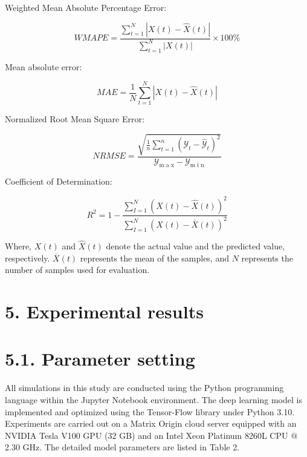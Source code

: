 \documentclass[
  10
]{article}
\begin{document}
Weighted Mean Absolute Percentage Error:

\[
W M A P E = \frac {\sum_ {t = 1} ^ {N} | X (t) - \widehat {X} (t) |}{\sum_ {t = 1} ^ {N} | X (t) |} \times 100 \% \tag{37}
\]

Mean absolute error:

\[
M A E = \frac {1}{N} \sum_ {t = 1} ^ {N} | X (t) - \widehat {X} (t) | \tag {38}
\]

Normalized Root Mean Square Error:

\[
N R M S E = \frac {\sqrt {\frac {1}{n} \sum_ {t = 1} ^ {n} \left(\mathcal {Y} _ {t} - \widehat {\mathcal {Y}} _ {t}\right) ^ {2}}}{\mathcal {Y} _ {\text {m a x}} - \mathcal {Y} _ {\text {m i n}}} \tag {39}
\]

Coefficient of Determination:

\[
R ^ {2} = 1 - \frac {\sum_ {I = 1} ^ {N} (X (t) - \widehat {X} (t)) ^ {2}}{\sum_ {I = 1} ^ {N} (X (t) - \bar {X} (t)) ^ {2}} \tag {40}
\]

Where, \(X ( t )\) and \(\widehat { X } ( t )\) denote the actual value
and the predicted value, respectively. \(\overline { { X } } ( t )\)
represents the mean of the samples, and \(N\) represents the number of
samples used for evaluation.

\section{5. Experimental results}\label{experimental-results}

\section{5.1. Parameter setting}\label{parameter-setting}

All simulations in this study are conducted using the Python programming
language within the Jupyter Notebook environment. The deep learning
model is implemented and optimized using the Tensor-Flow library under
Python 3.10. Experiments are carried out on a Matrix Origin cloud server
equipped with an NVIDIA Tesla V100 GPU (32 GB) and an Intel Xeon
Platinum 8260L CPU \(@\) 2.30 GHz. The detailed model parameters are
listed in Table 2.
\end{document}
